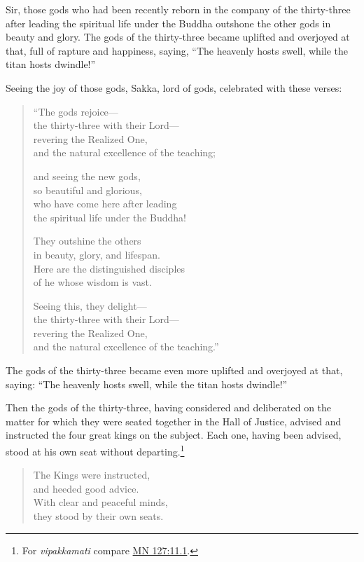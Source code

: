 \documentclass[12pt,openany]{book}%
\begin{document}
Sir, those gods who had been recently reborn in the company of the thirty-three after leading the spiritual life under the Buddha outshone the other gods in beauty and glory. The gods of the thirty-three became uplifted and overjoyed at that, full of rapture and happiness, saying, “The heavenly hosts swell, while the titan hosts dwindle!” 

Seeing the joy of those gods, Sakka, lord of gods, celebrated with these verses: 

\begin{verse}%
“The gods rejoice—\\
the thirty-three with their Lord—\\
revering the Realized One, \\
and the natural excellence of the teaching; 

and seeing the new gods, \\
so beautiful and glorious, \\
who have come here after leading \\
the spiritual life under the Buddha! 

They outshine the others \\
in beauty, glory, and lifespan. \\
Here are the distinguished disciples \\
of he whose wisdom is vast. 

Seeing this, they delight—\\
the thirty-three with their Lord—\\
revering the Realized One, \\
and the natural excellence of the teaching.” 

%
\end{verse}

The gods of the thirty-three became even more uplifted and overjoyed at that, saying: “The heavenly hosts swell, while the titan hosts dwindle!” 

Then the gods of the thirty-three, having considered and deliberated on the matter for which they were seated together in the Hall of Justice, advised and instructed the four great kings on the subject. Each one, having been advised, stood at his own seat without departing.\footnote{For \textit{vipakkamati} compare \href{https://suttacentral.net/mn127/en/sujato\#11.1}{MN 127:11.1}. } 

\begin{verse}%
The Kings were instructed, \\
and heeded good advice. \\
With clear and peaceful minds, \\
they stood by their own seats. 

%
\end{verse}
\end{document}

